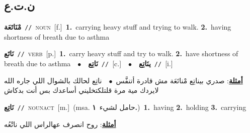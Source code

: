 \documentclass[10pt,a4paper,twoside]{article} %
\begin{document}
\begin{multicols}{2}
\vspace{-3mm}
\subsection*{\color{blue}\foreignlanguage{arabic}{ن.ت.ع}\color{blue}{}} 

{\setlength\topsep{0pt}\textbf{\foreignlanguage{arabic}{مْنَاتَعَة}}\ {\color{gray}\texttt{//}\color{black}}\ \textsc{noun}\ [f.]\ \textbf{1.}~carrying heavy stuff and trying to walk.  \textbf{2.}~having shortness of breath due to asthma\ } \vspace{2mm}

{\setlength\topsep{0pt}\textbf{\foreignlanguage{arabic}{نَاتَع}}\ {\color{gray}\texttt{//}\color{black}}\ \textsc{verb}\ [p.]\ \textbf{1.}~carry heavy stuff and try to walk.  \textbf{2.}~have shortness of breath due to asthma\ \ $\bullet$\ \ \setlength\topsep{0pt}\textbf{\foreignlanguage{arabic}{نَاتِع}}\ {\color{gray}\texttt{//}\color{black}}\ [c.]\ \ $\bullet$\ \ \setlength\topsep{0pt}\textbf{\foreignlanguage{arabic}{ينَاتِع}}\ {\color{gray}\texttt{//}\color{black}}\ [i.]\  \begin{flushright}\color{gray}\foreignlanguage{arabic}{\textbf{\underline{\foreignlanguage{arabic}{أمثلة}}}: صدري بيناتِع مْناتَعَة مش قادرة أتنفَّس\ $\bullet$\ \  ناتِع لحالك بالشوال اللي جاره الله لايردك مية مرة قلتلكتخليني أساعدك بس أنت بدكاش}\end{flushright}\color{black}} \vspace{2mm}

{\setlength\topsep{0pt}\textbf{\foreignlanguage{arabic}{نَاتِع}}\ {\color{gray}\texttt{//}\color{black}}\ \textsc{noun\textunderscore act}\ [m.]\ \color{gray}(msa. \foreignlanguage{arabic}{حامل لشيء}~\foreignlanguage{arabic}{\textbf{١.}})\color{black}\ \textbf{1.}~having  \textbf{2.}~holding  \textbf{3.}~carrying\  \begin{flushright}\color{gray}\foreignlanguage{arabic}{\textbf{\underline{\foreignlanguage{arabic}{أمثلة}}}: روح انصرف عهالراس اللي ناتْعُه}\end{flushright}\color{black}} \vspace{2mm}


\end{multicols}
\end{document}
